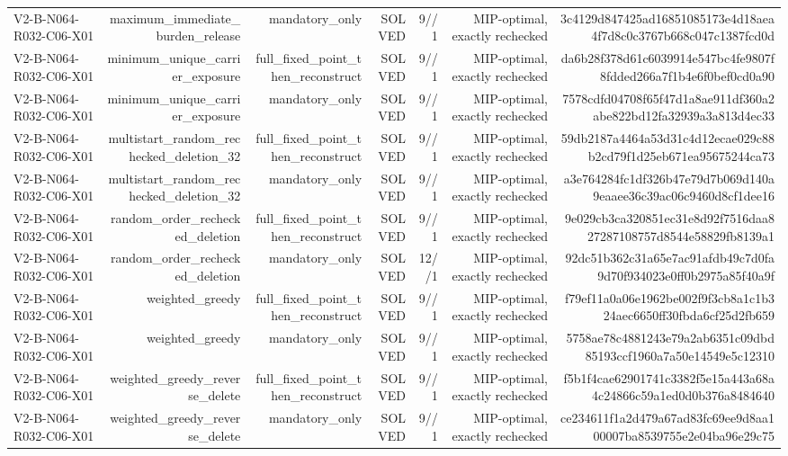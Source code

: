 {\begin{longtable}{lrrrrrr}
V2-B-N064-R032-C06-X01 & maximum\_immediate\_burden\_release & mandatory\_only & SOLVED & 9//1 & MIP-optimal, exactly rechecked & 3c4129d847425ad16851085173e4d18aea4f7d8c0c3767b668c047c1387fcd0d \\
V2-B-N064-R032-C06-X01 & minimum\_unique\_carrier\_exposure & full\_fixed\_point\_then\_reconstruct & SOLVED & 9//1 & MIP-optimal, exactly rechecked & da6b28f378d61c6039914e547bc4fe9807f8fdded266a7f1b4e6f0bef0cd0a90 \\
V2-B-N064-R032-C06-X01 & minimum\_unique\_carrier\_exposure & mandatory\_only & SOLVED & 9//1 & MIP-optimal, exactly rechecked & 7578cdfd04708f65f47d1a8ae911df360a2abe822bd12fa32939a3a813d4ec33 \\
V2-B-N064-R032-C06-X01 & multistart\_random\_rechecked\_deletion\_32 & full\_fixed\_point\_then\_reconstruct & SOLVED & 9//1 & MIP-optimal, exactly rechecked & 59db2187a4464a53d31c4d12ecae029c88b2cd79f1d25eb671ea95675244ca73 \\
V2-B-N064-R032-C06-X01 & multistart\_random\_rechecked\_deletion\_32 & mandatory\_only & SOLVED & 9//1 & MIP-optimal, exactly rechecked & a3e764284fc1df326b47e79d7b069d140a9eaaee36c39ac06c9460d8cf1dee16 \\
V2-B-N064-R032-C06-X01 & random\_order\_rechecked\_deletion & full\_fixed\_point\_then\_reconstruct & SOLVED & 9//1 & MIP-optimal, exactly rechecked & 9e029cb3ca320851ec31e8d92f7516daa827287108757d8544e58829fb8139a1 \\
V2-B-N064-R032-C06-X01 & random\_order\_rechecked\_deletion & mandatory\_only & SOLVED & 12//1 & MIP-optimal, exactly rechecked & 92dc51b362c31a65e7ac91afdb49c7d0fa9d70f934023e0ff0b2975a85f40a9f \\
V2-B-N064-R032-C06-X01 & weighted\_greedy & full\_fixed\_point\_then\_reconstruct & SOLVED & 9//1 & MIP-optimal, exactly rechecked & f79ef11a0a06e1962be002f9f3cb8a1c1b324aec6650ff30fbda6cf25d2fb659 \\
V2-B-N064-R032-C06-X01 & weighted\_greedy & mandatory\_only & SOLVED & 9//1 & MIP-optimal, exactly rechecked & 5758ae78c4881243e79a2ab6351c09dbd85193ccf1960a7a50e14549e5c12310 \\
V2-B-N064-R032-C06-X01 & weighted\_greedy\_reverse\_delete & full\_fixed\_point\_then\_reconstruct & SOLVED & 9//1 & MIP-optimal, exactly rechecked & f5b1f4cae62901741c3382f5e15a443a68a4c24866c59a1ed0d0b376a8484640 \\
V2-B-N064-R032-C06-X01 & weighted\_greedy\_reverse\_delete & mandatory\_only & SOLVED & 9//1 & MIP-optimal, exactly rechecked & ce234611f1a2d479a67ad83fc69ee9d8aa100007ba8539755e2e04ba96e29c75 \\

\end{longtable}}
